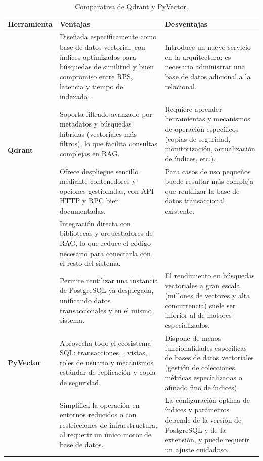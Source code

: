 \begin{table}[p]
	\centering
	\small
	\begin{tabularx}{\linewidth}{ p{}*{2}{>{}X}}
		\toprule
			\textbf{Herramienta} & \textbf{Ventajas} & \textbf{Desventajas} \\
		\midrule
		\multirow{4}{*}[-20ex]{\textbf{Qdrant}} & Diseñada específicamente como base de datos vectorial, con índices optimizados para búsquedas de similitud y buen compromiso entre RPS, latencia y tiempo de indexado~\cite{llmeng:handbook}. & Introduce un nuevo servicio en la arquitectura: es necesario administrar una base de datos adicional a la relacional. \\
		& Soporta filtrado avanzado por metadatos y búsquedas híbridas (vectoriales más filtros), lo que facilita consultas complejas en RAG. & Requiere aprender herramientas y mecanismos de operación específicos (copias de seguridad, monitorización, actualización de índices, etc.). \\
		& Ofrece despliegue sencillo mediante contenedores y opciones gestionadas, con API HTTP y RPC bien documentadas. & Para casos de uso pequeños puede resultar más compleja que reutilizar la base de datos transaccional existente. \\
		& Integración directa con bibliotecas y orquestadores de RAG, lo que reduce el código necesario para conectarla con el resto del sistema. & \\
			
		\midrule
		\multirow{3}{*}[-16ex]{\textbf{PyVector}} & Permite reutilizar una instancia de PostgreSQL ya desplegada, unificando datos transaccionales y \eng{embeddings} en el mismo sistema. & El rendimiento en búsquedas vectoriales a gran escala (millones de vectores y alta concurrencia) suele ser inferior al de motores especializados. \\
		& Aprovecha todo el ecosistema SQL: transacciones, \eng{joins}, vistas, roles de usuario y mecanismos estándar de replicación y copia de seguridad. & Dispone de menos funcionalidades específicas de bases de datos vectoriales (gestión de colecciones, métricas especializadas o afinado fino de índices). \\
		& Simplifica la operación en entornos reducidos o con restricciones de infraestructura, al requerir un único motor de base de datos. & La configuración óptima de índices y parámetros depende de la versión de PostgreSQL y de la extensión, y puede requerir un ajuste cuidadoso. \\
		 
		\bottomrule
	\end{tabularx}
	\caption{Comparativa de Qdrant y PyVector.}
	\label{tabla:bases-vectoriales}
\end{table}



